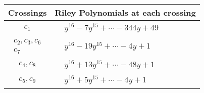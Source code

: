 \documentclass[1p]{elsarticle_modified}
\theoremstyle{definition}
\begin{document}
\begin{tabular}{m{50pt}|m{274pt}}
Crossings & \hspace{64pt}Riley Polynomials at each crossing \\
\hline $$\begin{aligned}c_{1}\end{aligned}$$&$\begin{aligned}
&y^{16}-7 y^{15}+\cdots-344 y+49
\end{aligned}$\\
\hline $$\begin{aligned}c_{2},c_{3},c_{6}\\c_{7}\end{aligned}$$&$\begin{aligned}
&y^{16}-19 y^{15}+\cdots-4 y+1
\end{aligned}$\\
\hline $$\begin{aligned}c_{4},c_{8}\end{aligned}$$&$\begin{aligned}
&y^{16}+13 y^{15}+\cdots-48 y+1
\end{aligned}$\\
\hline $$\begin{aligned}c_{5},c_{9}\end{aligned}$$&$\begin{aligned}
&y^{16}+5 y^{15}+\cdots-4 y+1
\end{aligned}$\\
\hline
\end{tabular}
\vskip 2pc
\end{document}
